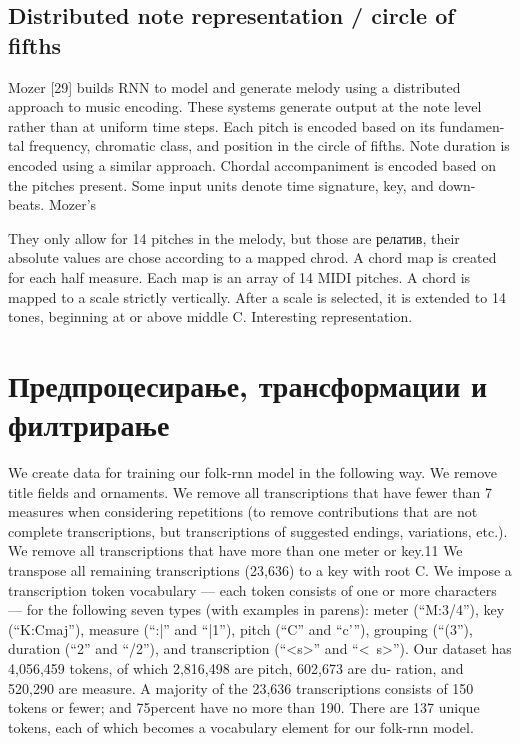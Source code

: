 \subsection{Distributed note representation / circle of fifths}

Mozer [29] builds RNN to model and generate melody using a distributed
approach to music encoding. These systems generate output at the note level rather than at uniform time steps. Each pitch is encoded based on its fundamen- tal frequency, chromatic class, and position in the circle of fifths. Note duration is encoded using a similar approach. Chordal accompaniment is encoded based on the pitches present. Some input units denote time signature, key, and down-
beats. Mozer’s

\cite{Biles1994} They only allow for 14 pitches in the melody, but those are релатив, their absolute values are chose according to a mapped chrod. A chord map is created for each half measure. Each map is an array of 14 MIDI pitches. A chord is mapped to a scale strictly vertically. After a scale is selected, it is extended to 14 tones, beginning at or above middle C. Interesting representation.

\section{Предпроцесирање, трансформации и филтрирање}

\cite{Sturm2016} We create data for training our folk-rnn model in the following way. We
remove title fields and ornaments. We remove all transcriptions that have fewer than 7 measures when considering repetitions (to remove contributions that are not complete transcriptions, but transcriptions of suggested endings, variations, etc.). We remove all transcriptions that have more than one meter or key.11 We transpose all remaining transcriptions (23,636) to a key with root C.
We impose a transcription token vocabulary — each token consists of one or more characters — for the following seven types (with examples in parens): meter (“M:3/4”), key (“K:Cmaj”), measure (“:|” and “|1”), pitch (“C” and “c’”),
grouping (“(3”), duration (“2” and “/2”), and transcription (“<s>” and “<\ s>”). 
Our dataset has 4,056,459 tokens, of which 2,816,498 are pitch, 602,673 are du- ration, and 520,290 are measure. A majority of the 23,636 transcriptions consists of 150 tokens or fewer; and 75percent have no more than 190. There are 137 unique tokens, each of which becomes a vocabulary element for our folk-rnn model.

